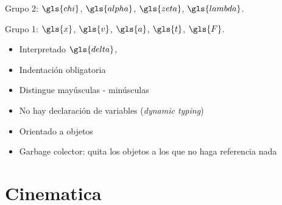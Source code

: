 \documentclass[letterpaper,12pt]{article}
\begin{document}
Grupo 2: $\gls{chi}$, $\gls{alpha}$, $\gls{zeta}$, $\gls{lambda}$.

Grupo 1: $\gls{x}$, $\gls{v}$, $\gls{a}$, $\gls{t}$,
$\gls{F}$.


\begin{itemize}
    \item Interpretado $\gls{delta}$,
    \item Indentación obligatoria
    \item Distingue mayúsculas - minúsculas
    \item No hay declaración de variables (\textit{dynamic typing})
    \item Orientado a objetos  
    \item Garbage colector: quita los objetos a los que no haga referencia nada
\end{itemize}

\section{Cinematica}
\end{document}
